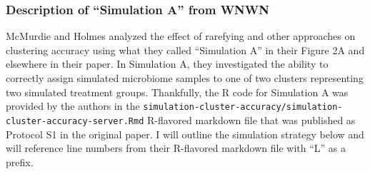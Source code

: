 \documentclass[
]{article}
\begin{document}
\hypertarget{description-of-simulation-a-from-wnwn}{%
\subsubsection{Description of ``Simulation A'' from
WNWN}\label{description-of-simulation-a-from-wnwn}}

McMurdie and Holmes analyzed the effect of rarefying and other
approaches on clustering accuracy using what they called ``Simulation
A'' in their Figure 2A and elsewhere in their paper. In Simulation A,
they investigated the ability to correctly assign simulated microbiome
samples to one of two clusters representing two simulated treatment
groups. Thankfully, the R code for Simulation A was provided by the
authors in the
\texttt{simulation-cluster-accuracy/simulation-cluster-accuracy-server.Rmd}
R-flavored markdown file that was published as Protocol S1 in the
original paper. I will outline the simulation strategy below and will
reference line numbers from their R-flavored markdown file with ``L'' as
a prefix.
\end{document}
